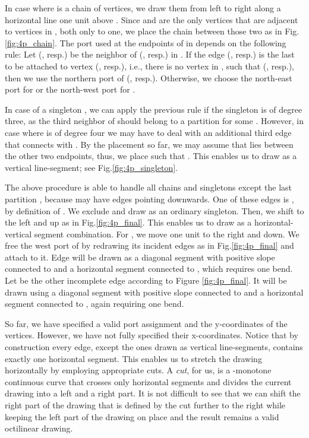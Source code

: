\documentclass[a4paper,twoside,11pt]{article}
\begin{document}
In case where  is a chain of  vertices, we draw them from left to right along a horizontal line
one unit above . Since  and  are the only
vertices that are adjacent to vertices in , both only to
one, we place the chain between those two as in
Fig.\ref{fig:4p_chain}. The port used at the endpoints of  in
 depends on the following rule: Let  (,
resp.) be the neighbor of  (, resp.) in . If the
edge  (, resp.) is the last to be attached
to vertex  (, resp.), i.e., there is no vertex  in
,  such that  (,
resp.), then we use the northern port of  (, resp.).
Otherwise, we choose the north-east port for  or the
north-west port for .

In case of a singleton , we can apply the previous
rule if the singleton is of degree three, as the third neighbor of
 should belong to a partition  for some .
However, in case where  is of degree four we may have to deal with
an additional third edge  that connects  with
. By the placement so far, we may assume that  lies
between the other two endpoints, thus, we place  such that
. This enables us to draw  as a vertical
line-segment; see Fig.\ref{fig:4p_singleton}.

The above procedure is able to handle all chains and singletons
except the last partition , because  may have  edges
pointing downwards. One of these edges is , by
definition of . We exclude  and draw  as an
ordinary singleton. Then, we shift  to the left and up as in
Fig.\ref{fig:4p_final}. This enables us to draw  as a
horizontal-vertical segment combination. For , we move
 one unit to the right and down. We free the west port of 
by redrawing its incident edges as in Fig.\ref{fig:4p_final} and
attach  to it. Edge  will be drawn as a
diagonal segment with positive slope connected to  and a
horizontal segment connected to , which requires one bend. Let
 be the other incomplete edge according to Figure
\ref{fig:4p_final}. It will be drawn using a diagonal segment with
positive slope connected to  and a horizontal segment connected
to , again requiring one bend.

So far, we have specified a valid port assignment and the
y-coordinates of the vertices. However, we have not fully specified
their x-coordinates. Notice that by construction every edge, except
the ones drawn as vertical line-segments, contains exactly one
horizontal segment. This enables us to stretch the drawing
horizontally by employing appropriate cuts. A \emph{cut}, for us, is
a -monotone continuous curve that crosses only horizontal
segments and divides the current drawing into a left and a right
part. It is not difficult to see that we can shift the right part of
the drawing that is defined by the cut further to the right while
keeping the left part of the drawing on place and the result remains
a valid octilinear drawing.
\end{document}
